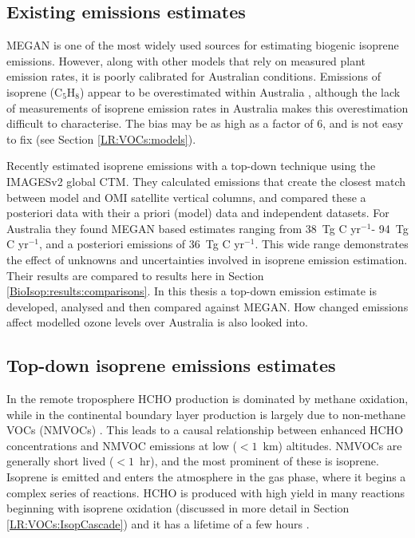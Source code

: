 \documentclass[acp, manuscript]{copernicus}
\newcommand{\parencite}{\citep}
\newcommand{\textcite}{\citet}
\newcommand{\tgcpyr}{~Tg C yr$^{-1}$}
\begin{document}
\subsection{Existing emissions estimates}


MEGAN is one of the most widely used sources for estimating biogenic isoprene emissions.
However, along with other models that rely on measured plant emission rates, it is poorly calibrated for Australian conditions.
Emissions of isoprene (C$_5$H$_8$) appear to be overestimated within Australia \parencite{Sindelarova2014,Stavrakou2014,Bauwens2016,Emmerson2016}, although the lack of measurements of isoprene emission rates in Australia makes this overestimation difficult to characterise.
The bias may be as high as a factor of 6, and is not easy to fix (see Section \ref{LR:VOCs:models}).


Recently \textcite{Bauwens2016} estimated isoprene emissions with a top-down technique using the IMAGESv2 global CTM.
They calculated emissions that create the closest match between model and OMI satellite vertical columns, and compared these a posteriori data with their a priori (model) data and independent datasets.
For Australia they found %
MEGAN based estimates ranging from 38\tgcpyr - 94\tgcpyr, and a posteriori emissions of 36\tgcpyr.
This wide range demonstrates the effect of unknowns and uncertainties involved in isoprene emission estimation. Their results are compared to results here in Section \ref{BioIsop:results:comparisons}.
In this thesis a top-down emission estimate is developed, analysed and then compared against MEGAN. 
How changed emissions affect modelled ozone levels over Australia is also looked into.

\subsection{Top-down isoprene emissions estimates}
\label{BioIsop:intro:top_down_estimates}

In the remote troposphere HCHO production is dominated by methane oxidation, while in the continental boundary layer production is largely due to non-methane VOCs (NMVOCs) \parencite{Abbot2003, Kefauver2014}.
This leads to a causal relationship between enhanced HCHO concentrations and NMVOC emissions at low ($<1$~km) altitudes.
NMVOCs are generally short lived ($<1$~hr), and the most prominent of these is isoprene.
Isoprene is emitted and enters the atmosphere in the gas phase, where it begins a complex series of reactions.
HCHO is produced with high yield in many reactions beginning with isoprene oxidation (discussed in more detail in Section \ref{LR:VOCs:IsopCascade}) and it has a lifetime of a few hours \parencite{Kefauver2014}.
\end{document}

